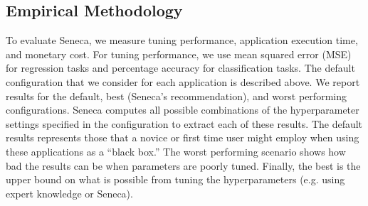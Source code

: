 





\subsection{Empirical Methodology}

To evaluate Seneca, we measure tuning performance, application execution time,
and monetary cost.  For tuning performance, we use mean squared error (MSE)
for regression tasks and percentage accuracy for classification tasks. The
default configuration that we consider for each application is described
above.  We report results for the default, best (Seneca's recommendation), and
worst performing configurations.  Seneca computes all possible combinations of
the hyperparameter settings specified in the configuration to extract each of
these results.  The default results represents those that a novice or first
time user might employ when using these applications as a ``black box.''  The
worst performing scenario shows how bad the results can be when parameters are
poorly tuned.  Finally, the best is the upper bound on what is possible from
tuning the hyperparameters (e.g. using expert knowledge or Seneca). 

